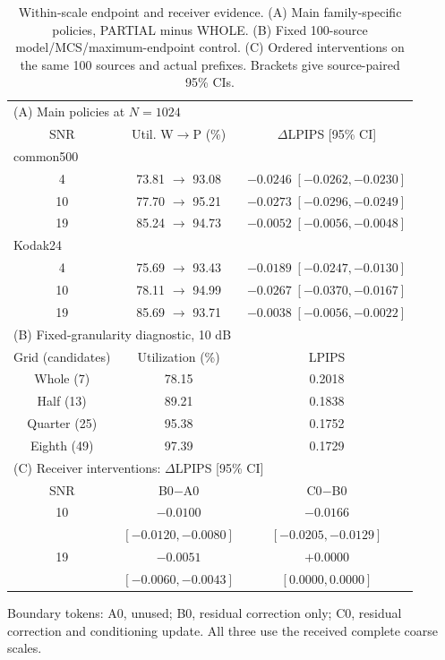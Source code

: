 \begin{table}[t]
\caption{Within-scale endpoint and receiver evidence. (A) Main family-specific policies, PARTIAL minus WHOLE. (B) Fixed 100-source model/MCS/maximum-endpoint control. (C) Ordered interventions on the same 100 sources and actual prefixes. Brackets give source-paired 95\% CIs.}
\label{tab:internal}
\centering\footnotesize
\setlength{\tabcolsep}{2.5pt}
\begin{tabular}{ccc}
\toprule
\multicolumn{3}{l}{(A) Main policies at $N=1024$} \\
SNR & Util. W$\to$P (\%) & $\Delta$LPIPS [95\% CI] \\
\midrule
\multicolumn{3}{l}{common500} \\
4 & 73.81 $\to$ 93.08 & $-0.0246\;[-0.0262,-0.0230]$ \\
10 & 77.70 $\to$ 95.21 & $-0.0273\;[-0.0296,-0.0249]$ \\
19 & 85.24 $\to$ 94.73 & $-0.0052\;[-0.0056,-0.0048]$ \\
\multicolumn{3}{l}{Kodak24} \\
4 & 75.69 $\to$ 93.43 & $-0.0189\;[-0.0247,-0.0130]$ \\
10 & 78.11 $\to$ 94.99 & $-0.0267\;[-0.0370,-0.0167]$ \\
19 & 85.69 $\to$ 93.71 & $-0.0038\;[-0.0056,-0.0022]$ \\
\midrule
\multicolumn{3}{l}{(B) Fixed-granularity diagnostic, 10 dB} \\
Grid (candidates) & Utilization (\%) & LPIPS \\
Whole (7) & 78.15 & 0.2018 \\
Half (13) & 89.21 & 0.1838 \\
Quarter (25) & 95.38 & 0.1752 \\
Eighth (49) & 97.39 & 0.1729 \\
\midrule
\multicolumn{3}{l}{(C) Receiver interventions: $\Delta$LPIPS [95\% CI]} \\
SNR & B0$-$A0 & C0$-$B0 \\
10 & $-0.0100$ & $-0.0166$ \\
 & $[-0.0120,-0.0080]$ & $[-0.0205,-0.0129]$ \\
19 & $-0.0051$ & $+0.0000$ \\
 & $[-0.0060,-0.0043]$ & $[0.0000,0.0000]$ \\
\bottomrule
\end{tabular}
\par\smallskip\parbox{\columnwidth}{\footnotesize Boundary tokens: A0, unused; B0, residual correction only; C0, residual correction and conditioning update. All three use the received complete coarse scales.}
\end{table}

